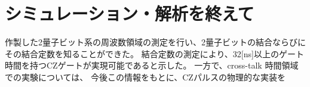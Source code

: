 \section{シミュレーション・解析を終えて}
作製した2量子ビット系の周波数領域の測定を行い、2量子ビットの結合ならびにその結合定数を知ることができた。
結合定数の測定により、32[ns]以上のゲート時間を持つCZゲートが実現可能であると示した。
一方で、cross-talk
時間領域での実験については、
今後この情報をもとに、CZパルスの物理的な実装を
